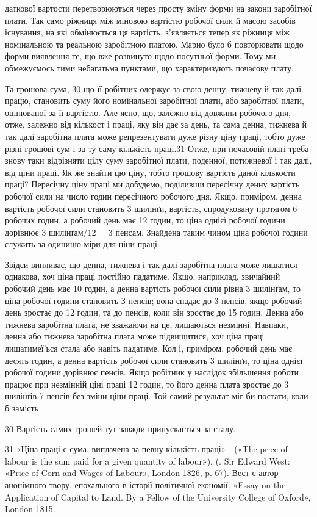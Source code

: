 даткової вартости перетворюються через просту зміну форми
на закони заробітної плати. Так само ріжниця між міновою вартістю
робочої сили й масою засобів існування, на які обмінюється
ця вартість, з’являється тепер як ріжниця між номінальною та
реальною заробітною платою. Марно було б повторювати щодо
форми виявлення те, що вже розвинуто щодо посутньої форми.
Тому ми обмежуємось тими небагатьма пунктами, що характеризують
почасову плату.

Та грошова сума, 30 що її робітник одержує за свою денну,
тижневу й так далі працю, становить суму його номінальної
заробітної плати, або заробітної плати, оцінюваної за її вартістю.
Але ясно, що, залежно від довжини робочого дня, отже,
залежно від кількост і праці, яку він дає за день, та сама денна,
тижнева й так далі заробітна плата може репрезентувати дуже
різну ціну праці, тобто дуже різні грошові сум і за ту саму кількість
праці.31 Отже, при почасовій платі треба знову таки відрізняти
цілу суму заробітної плати, поденної, потижневої і так
далі, від ціни праці. Як же знайти цю ціну, тобто грошову вартість
даної кількости праці? Пересічну ціну праці ми добудемо,
поділивши пересічну денну вартість робочої сили на число годин
пересічного робочого дня. Якщо, приміром, денна вартість
робочої сили становить 3 шилінґи, вартість, спродуковану протягом
6 робочих годин, а робочий день має 12 годин, то ціна однієї
робочої години дорівнює 3 шилінґам/12 = 3 пенсам. Знайдена
таким чином ціна робочої години служить за одиницю міри для
ціни праці.

Звідси випливає, що денна, тижнева і так далі заробітна плата
може лишатися однакова, хоч ціна праці постійно падатиме.
Якщо, наприклад, звичайний робочий день має 10 годин, а денна
вартість робочої сили рівна 3 шилінґам, то ціна робочої години
становить З пенсів; вона спадає до 3 пенсів, якщо робочий день
зростає до 12 годин, та до  пенсів, коли він зростає до 15 годин.
Денна або тижнева заробітна плата, не зважаючи на це,
лишаються незмінні. Навпаки, денна або тижнева заробітна
плата може підвищитися, хоч ціна праці лишатимеї'ься стала або
навіть падатиме. Кол і, приміром, робочий день має десять годин,
а денна вартість робочої сили становить 3 шилінґи, то ціна однієї
робочої години дорівнює  пенсів. Якщо робітник у наслідок
збільшення роботи працює при незмінній ціні праці 12 годин,
то його денна плата зростає до 3 шилінґів 7 пенсів без зміни
ціни праці. Той самий результат міг би постати, коли б замість

30 Вартість самих грошей тут завжди припускається за сталу.

31 «Ціна праці є сума, виплачена за певну кількість праці» - («The
price of labour is the sum paid for a given quantity of labour»). (. Sir Edward
West: «Price of Corn and Wages of Labour», London 1826, p. 67).
Вест є автор анонімного твору, епохального в історії політичної економії:
«Essay on the Application of Capital to Land. By a Fellow of the
University College of Oxford», London 1815.
